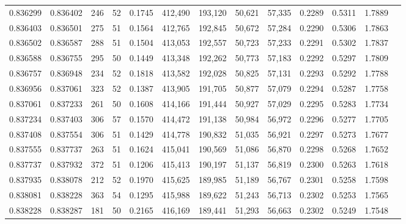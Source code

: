 \begin{tabular}{rrrrrrrrrrrrr}
0.836299 & 0.836402 &   246 &  52 &                                     0.1745 & 412,490 & 193,120 &  50,621 &  57,335 & 0.2289 & 0.5311 & 1.7889 \\
0.836403 & 0.836501 &   275 &  51 &                                     0.1564 & 412,765 & 192,845 &  50,672 &  57,284 & 0.2290 & 0.5306 & 1.7863 \\
0.836502 & 0.836587 &   288 &  51 &                                     0.1504 & 413,053 & 192,557 &  50,723 &  57,233 & 0.2291 & 0.5302 & 1.7837 \\
0.836588 & 0.836755 &   295 &  50 &                                     0.1449 & 413,348 & 192,262 &  50,773 &  57,183 & 0.2292 & 0.5297 & 1.7809 \\
0.836757 & 0.836948 &   234 &  52 &                                     0.1818 & 413,582 & 192,028 &  50,825 &  57,131 & 0.2293 & 0.5292 & 1.7788 \\
0.836956 & 0.837061 &   323 &  52 &                                     0.1387 & 413,905 & 191,705 &  50,877 &  57,079 & 0.2294 & 0.5287 & 1.7758 \\
0.837061 & 0.837233 &   261 &  50 &                                     0.1608 & 414,166 & 191,444 &  50,927 &  57,029 & 0.2295 & 0.5283 & 1.7734 \\
0.837234 & 0.837403 &   306 &  57 &                                     0.1570 & 414,472 & 191,138 &  50,984 &  56,972 & 0.2296 & 0.5277 & 1.7705 \\
0.837408 & 0.837554 &   306 &  51 &                                     0.1429 & 414,778 & 190,832 &  51,035 &  56,921 & 0.2297 & 0.5273 & 1.7677 \\
0.837555 & 0.837737 &   263 &  51 &                                     0.1624 & 415,041 & 190,569 &  51,086 &  56,870 & 0.2298 & 0.5268 & 1.7652 \\
0.837737 & 0.837932 &   372 &  51 &                                     0.1206 & 415,413 & 190,197 &  51,137 &  56,819 & 0.2300 & 0.5263 & 1.7618 \\
0.837935 & 0.838078 &   212 &  52 &                                     0.1970 & 415,625 & 189,985 &  51,189 &  56,767 & 0.2301 & 0.5258 & 1.7598 \\
0.838081 & 0.838228 &   363 &  54 &                                     0.1295 & 415,988 & 189,622 &  51,243 &  56,713 & 0.2302 & 0.5253 & 1.7565 \\
0.838228 & 0.838287 &   181 &  50 &                                     0.2165 & 416,169 & 189,441 &  51,293 &  56,663 & 0.2302 & 0.5249 & 1.7548 \\

\end{tabular}
